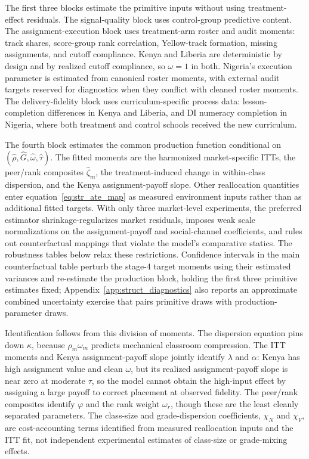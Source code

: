 \documentclass[11pt]{article}
\begin{document}
The first three blocks estimate the primitive inputs without using treatment-effect residuals. The signal-quality block uses control-group predictive content. The assignment-execution block uses treatment-arm roster and audit moments: track shares, score-group rank correlation, Yellow-track formation, missing assignments, and cutoff compliance. Kenya and Liberia are deterministic by design and by realized cutoff compliance, so $\omega=1$ in both. Nigeria's execution parameter is estimated from canonical roster moments, with external audit targets reserved for diagnostics when they conflict with cleaned roster moments. The delivery-fidelity block uses curriculum-specific process data: lesson-completion differences in Kenya and Liberia, and DI numeracy completion in Nigeria, where both treatment and control schools received the new curriculum.

The fourth block estimates the common production function conditional on $(\hat{\rho},\hat{G},\hat{\omega},\hat{\tau})$. The fitted moments are the harmonized market-specific ITTs, the peer/rank composites $\hat{\zeta}_m$, the treatment-induced change in within-class dispersion, and the Kenya assignment-payoff slope. Other reallocation quantities enter equation~\eqref{eq:str_ate_map} as measured environment inputs rather than as additional fitted targets. With only three market-level experiments, the preferred estimator shrinkage-regularizes market residuals, imposes weak scale normalizations on the assignment-payoff and social-channel coefficients, and rules out counterfactual mappings that violate the model's comparative statics. The robustness tables below relax these restrictions. Confidence intervals in the main counterfactual table perturb the stage-4 target moments using their estimated variances and re-estimate the production block, holding the first three primitive estimates fixed; Appendix~\ref{app:struct_diagnostics} also reports an approximate combined uncertainty exercise that pairs primitive draws with production-parameter draws.

Identification follows from this division of moments. The dispersion equation pins down $\kappa$, because $\rho_m\omega_m$ predicts mechanical classroom compression. The ITT moments and Kenya assignment-payoff slope jointly identify $\lambda$ and $\alpha$: Kenya has high assignment value and clean $\omega$, but its realized assignment-payoff slope is near zero at moderate $\tau$, so the model cannot obtain the high-input effect by assigning a large payoff to correct placement at observed fidelity. The peer/rank composites identify $\varphi$ and the rank weight $\omega_r$, though these are the least cleanly separated parameters. The class-size and grade-dispersion coefficients, $\chi_N$ and $\chi_V$, are cost-accounting terms identified from measured reallocation inputs and the ITT fit, not independent experimental estimates of class-size or grade-mixing effects.
\end{document}
